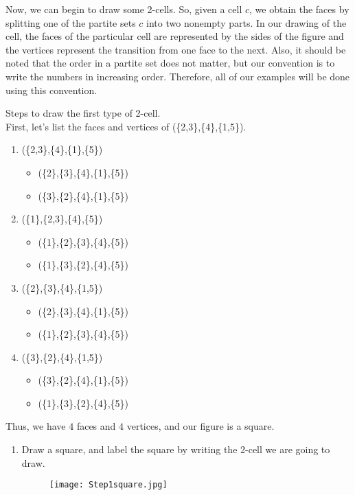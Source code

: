 \documentclass{amsart}
\begin{document}
Now, we can begin to draw some 2-cells. So, given a cell $c$, we obtain the faces by splitting one of the partite sets $c$ into two nonempty parts\cite{PANZU}. In our drawing of the cell, the faces of the particular cell are represented by the sides of the figure and the vertices represent the transition from one face to the next. Also, it should be noted that the order in a partite set does not matter, but our convention is to write the numbers in increasing order. Therefore, all of our examples will be done using this convention.
\begin{exmp}
Steps to draw the first type of 2-cell.\\
First, let's list the faces and vertices of (\{2,3\},\{4\},\{1,5\}).
\begin{enumerate}
\item 
(\{2,3\},\{4\},\{1\},\{5\})
\begin{itemize}
\item 
(\{2\},\{3\},\{4\},\{1\},\{5\})
\item
(\{3\},\{2\},\{4\},\{1\},\{5\})
\end{itemize}
\item
(\{1\},\{2,3\},\{4\},\{5\})
\begin{itemize}
\item 
(\{1\},\{2\},\{3\},\{4\},\{5\})
\item
(\{1\},\{3\},\{2\},\{4\},\{5\})
\end{itemize}
\item
(\{2\},\{3\},\{4\},\{1,5\})
\begin{itemize}
\item 
(\{2\},\{3\},\{4\},\{1\},\{5\})
\item
(\{1\},\{2\},\{3\},\{4\},\{5\})
\end{itemize}
\item
(\{3\},\{2\},\{4\},\{1,5\})
\begin{itemize}
\item 
(\{3\},\{2\},\{4\},\{1\},\{5\})
\item
(\{1\},\{3\},\{2\},\{4\},\{5\})
\end{itemize}
\end{enumerate}
Thus, we have $4$ faces and $4$ vertices, and our figure is a square.
\begin{enumerate}
\item
Draw a square, and label the square by writing the 2-cell we are going to draw.
\begin{figure}[h] 
\texttt{[image: Step1square.jpg]}
\centering

\end{figure}
\end{enumerate}
\end{exmp}
\end{document}

